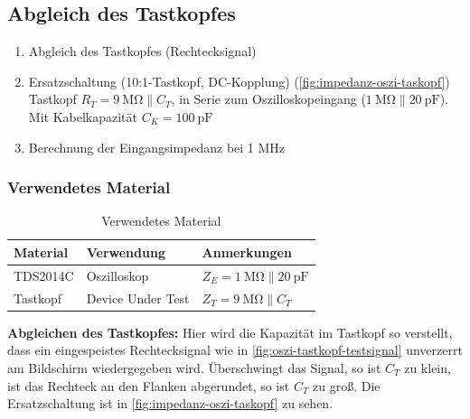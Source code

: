 \subsection{Abgleich des Tastkopfes}\label{sec:2-4}

\begin{highlightblock}
	\begin{enumerate}[label=\textbf{\alph*:}, ref=\alph*,noitemsep]
		\item\label{itm:2-P4-1} Abgleich des Tastkopfes (Rechtecksignal)
		\item\label{itm:2-P4-2}
			Ersatzschaltung (10:1-Tastkopf, DC-Kopplung) (\autoref{fig:impedanz-oszi-taskopf})\\
		    Tastkopf $R_T = \SI{9}{\mega\ohm} \parallel C_T$, in Serie zum Oszilloskopeingang ($\SI{1}{\mega\ohm} \parallel \SI{20}{\pico\farad}$). \\
			Mit Kabelkapazität $C_K = \SI{100}{\pico\farad}$
		\item\label{itm:2-P4-3} Berechnung der Eingangsimpedanz bei 1 MHz
	\end{enumerate}

\end{highlightblock}

\subsubsection{Verwendetes Material}

\begin{table}[h]
	\centering
	\caption{Verwendetes Material}
	\begin{tabularx}{\textwidth}{XXX}
		\textbf{Material} & \textbf{Verwendung} & \textbf{Anmerkungen} \\ \midrule
		TDS2014C & Oszilloskop & $Z_E = \SI{1}{\mega\ohm}\parallel\SI{20}{\pico\farad}$ \\
		Tastkopf & Device Under Test & $Z_T = \SI{9}{\mega\ohm}\parallel C_T$
	\end{tabularx}
\end{table}

\marginref{\ref{itm:2-P4-1}, \ref{itm:2-P4-2}}

\textbf{Abgleichen des Tastkopfes:} Hier wird die Kapazität im Tastkopf so
verstellt, dass ein eingespeistes Rechtecksignal wie in \autoref{fig:oszi-tastkopf-testsignal} unverzerrt am Bildschirm 
wiedergegeben wird. Überschwingt das Signal, so ist $C_T$ zu klein, ist das Rechteck an
den Flanken abgerundet, so ist $C_T$ zu groß. Die Ersatzschaltung ist
in \autoref{fig:impedanz-oszi-taskopf} zu sehen.

